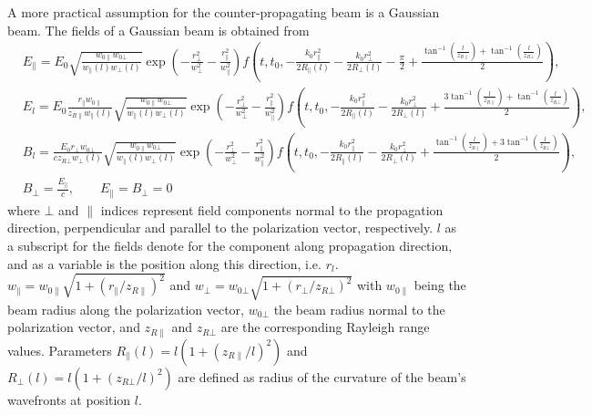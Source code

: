 A more practical assumption for the counter-propagating beam is a Gaussian beam.
%
The fields of a Gaussian beam is obtained from
%
\begin{align}
\label{opticalUndulatorGB}
& E_\parallel = E_0 \sqrt{\frac{w_{0\parallel}w_{0\bot}}{w_\parallel (l)w_\bot (l)}} 
\exp\left( -\frac{r_\bot^2}{w_\bot^2}-\frac{r_\parallel^2}{w_\parallel^2} \right) 
f\left(t,t_0,-\frac{k_0 r_\parallel^2}{2R_\parallel(l)} - \frac{k_0 r_\bot^2}{2R_\bot(l)} - \frac{\pi}{2} + \frac{ \tan^{-1} \left(\frac{l}{z_{R\parallel}}\right) + \tan^{-1} \left(\frac{l}{z_{R\bot}} \right) }{2} \right), \nonumber \\
& E_l = E_0 \frac{r_\parallel w_{0\parallel}}{z_{R\parallel} w_\parallel(l)} \sqrt{\frac{w_{0\parallel}w_{0\bot}}{w_\parallel(l)w_\bot (l)}} 
\exp\left( -\frac{r_\bot^2}{w_\bot^2}-\frac{r_\parallel^2}{w_\parallel^2} \right) 
f\left(t,t_0,-\frac{k_0 r_\parallel^2}{2R_\parallel(l)} - \frac{k_0 r_\bot^2}{2R_\bot(l)} + \frac{ 3\tan^{-1} \left(\frac{l}{z_{R\parallel}}\right) + \tan^{-1} \left(\frac{l}{z_{R\bot}} \right) }{2} \right), \nonumber \\
& B_l = \frac{E_0 r_\bot w_{0\bot}}{c z_{R\bot} w_\bot(l)} \sqrt{\frac{w_{0\parallel}w_{0\bot}}{w_\parallel (l)w_\bot (l)}} 
\exp\left( -\frac{r_\bot^2}{w_\bot^2}-\frac{r_\parallel^2}{w_\parallel^2} \right) 
f\left(t,t_0,-\frac{k_0 r_\parallel^2}{2R_\parallel(l)} - \frac{k_0 r_\bot^2}{2R_\bot(l)} + \frac{ \tan^{-1} \left(\frac{l}{z_{R\parallel}}\right) + 3 \tan^{-1} \left(\frac{l}{z_{R\bot}} \right) }{2} \right), \nonumber \\
& B_\bot = \frac{E_\parallel}{c}, \qquad E_\parallel = B_\bot = 0
\end{align}
%
where $\bot$ and $\parallel$ indices represent field components normal to the propagation direction, perpendicular and parallel to the polarization vector, respectively.
%
$l$ as a subscript for the fields denote for the component along propagation direction, and as a variable is the position along this direction, i.e. $r_l$.
%
$w_\parallel=w_{0\parallel}\sqrt{1+(r_\parallel/z_{R\parallel})^2}$ and $w_\bot=w_{0\bot}\sqrt{1+(r_\bot/z_{R\bot})^2}$ with $w_{0\parallel}$ being the beam radius along the polarization vector, $w_{0\bot}$ the beam radius normal to the polarization vector, and $z_{R\parallel}$ and $z_{R\bot}$ are the corresponding Rayleigh range values.
%
Parameters $R_\parallel(l)=l(1+(z_{R\parallel}/l)^2)$ and $R_\bot(l)=l(1+(z_{R\bot}/l)^2)$ are defined as radius of the curvature of the beam's wavefronts at position $l$.

